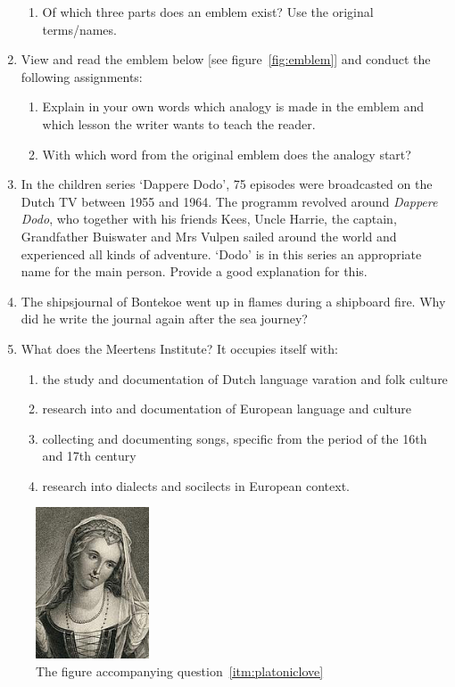 \begin{enumerate}
\begin{enumerate}
            \item Of which three parts does an emblem exist? Use the original terms/names.
        \end{enumerate}
    \item View and read the emblem below [see figure~\ref{fig:emblem}] and conduct the following assignments:\label{itm:emblem}
        \begin{enumerate}
            \item Explain in your own words which analogy is made in the emblem and which lesson the writer wants to teach the reader.
            \item With which word from the original emblem does the analogy start?
        \end{enumerate}
    \item In the children series `Dappere Dodo', 75 episodes were broadcasted on the Dutch TV between 1955 and 1964. The programm revolved around \emph{Dappere Dodo}, who together with his friends Kees, Uncle Harrie, the captain, Grandfather Buiswater and Mrs Vulpen sailed around the world and experienced all kinds of adventure. `Dodo' is in this series an appropriate name for the main person. Provide a good explanation for this.
    \item The shipsjournal of Bontekoe went up in flames during a shipboard fire. Why did he write the journal again after the sea journey?
    \item What does the Meertens Institute? It occupies itself with:
        \begin{enumerate}
            \item the study and documentation of Dutch language varation and folk culture
            \item research into and documentation of European language and culture
            \item collecting and documenting songs, specific from the period of the 16th and 17th century
            \item research into dialects and socilects in European context.
        \end{enumerate}
\end{enumerate}

\begin{figure}
    \centering
    \includegraphics[width=0.3\textwidth]{img/laura.jpg}
    \caption{The figure accompanying question~\protect\ref{itm:platoniclove}}
    \label{fig:laura}
\end{figure}

